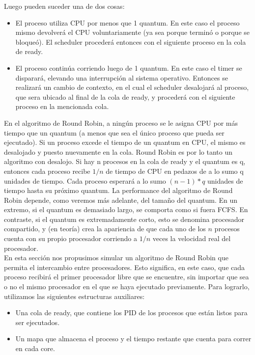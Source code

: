 Luego pueden suceder una de dos cosas: 
\begin{itemize}
	\item El proceso utiliza CPU por menos que 1 quantum. En este caso el proceso mismo devolverá el CPU voluntariamente (ya sea porque terminó o porque se bloqueó). El scheduler procederá entonces con el siguiente proceso en la cola de ready. 
	\item El proceso continúa corriendo luego de 1 quantum. En este caso el timer se disparará, elevando una interrupción al sistema operativo. Entonces se realizará un cambio de contexto, en el cual el scheduler desalojará al proceso, que sera ubicado al final de la cola de ready, y procederá con el siguiente proceso en la mencionada cola.   
\end{itemize} 

En el algoritmo de Round Robin, a ningún proceso se le asigna CPU por más tiempo que un quantum (a menos que sea el único proceso que pueda ser ejecutado). Si un proceso excede el tiempo de un quantum en CPU, el mismo es desalojado y puesto nuevamente en la cola. Round Robin es por lo tanto un algoritmo con desalojo.
Si hay n procesos en la cola de ready y el quantum es q, entonces cada proceso recibe $1/n$ de tiempo de CPU en pedazos de a lo sumo q unidades de tiempo. Cada proceso esperará a lo sumo $(n-1)*q$ unidades de tiempo hasta su próximo quantum.   
La performance del algoritmo de Round Robin depende, como veremos más adelante, del tamaño del quantum. En un extremo, si el quantum es demasiado largo, se comporta como si fuera FCFS. En contraste, si el quantum es extremadamente corto, esto se denomina procesador compartido, y (en teoría) crea la apariencia de que cada uno de los $n$ procesos cuenta con su propio procesador corriendo a $1/n$ veces la velocidad real del procesador. \\

En esta sección nos propusimos simular un algoritmo de Round Robin que permita el intercambio entre procesadores. Esto significa, en este caso, que cada proceso recibirá el primer procesador libre que se encuentre, sin importar que sea o no el mismo procesador en el que se haya ejecutado previamente.
Para lograrlo, utilizamos las siguientes estructuras auxiliares: 
\begin{itemize}
	\item Una cola de ready, que contiene los PID de los procesos que están listos para ser ejecutados.
	\item Un mapa que almacena el proceso y el tiempo restante que cuenta para correr en cada core.
\end{itemize} 

